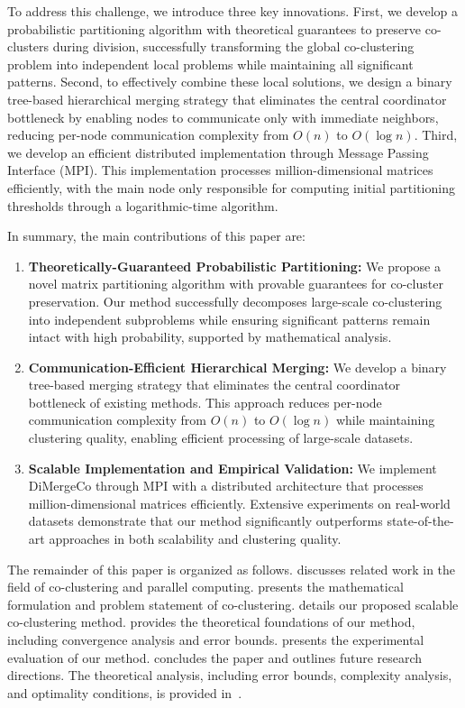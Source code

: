 \documentclass[journal]{IEEEtran}
\begin{document}
To address this challenge, we introduce three key innovations. First, we develop a probabilistic partitioning algorithm with theoretical guarantees to preserve co-clusters during division, successfully transforming the global co-clustering problem into independent local problems while maintaining all significant patterns. Second, to effectively combine these local solutions, we design a binary tree-based hierarchical merging strategy that eliminates the central coordinator bottleneck by enabling nodes to communicate only with immediate neighbors, reducing per-node communication complexity from $O(n)$ to $O(\log n)$. Third, we develop an efficient distributed implementation through Message Passing Interface (MPI). This implementation processes million-dimensional matrices efficiently, with the main node only responsible for computing initial partitioning thresholds through a logarithmic-time algorithm.

In summary, the main contributions of this paper are:
\begin{enumerate}
    \item \textbf{Theoretically-Guaranteed Probabilistic Partitioning:} We propose a novel matrix partitioning algorithm with provable guarantees for co-cluster preservation. Our method successfully decomposes large-scale co-clustering into independent subproblems while ensuring significant patterns remain intact with high probability, supported by mathematical analysis.

    \item \textbf{Communication-Efficient Hierarchical Merging:} We develop a binary tree-based merging strategy that eliminates the central coordinator bottleneck of existing methods. This approach reduces per-node communication complexity from $O(n)$ to $O(\log n)$ while maintaining clustering quality, enabling efficient processing of large-scale datasets.

    \item \textbf{Scalable Implementation and Empirical Validation:} We implement DiMergeCo through MPI with a distributed architecture that processes million-dimensional matrices efficiently. Extensive experiments on real-world datasets demonstrate that our method significantly outperforms state-of-the-art approaches in both scalability and clustering quality.
\end{enumerate}

The remainder of this paper is organized as follows.  discusses related work in the field of co-clustering and parallel computing.  presents the mathematical formulation and problem statement of co-clustering.  details our proposed scalable co-clustering method.  provides the theoretical foundations of our method, including convergence analysis and error bounds.  presents the experimental evaluation of our method.  concludes the paper and outlines future research directions. The theoretical analysis, including error bounds, complexity analysis, and optimality conditions, is provided in~.
\end{document}
